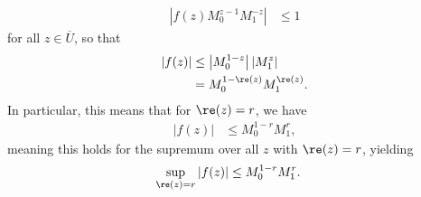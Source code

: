 \documentclass[10pt]{mypackage}
\begin{document}
\begin{solution}
\begin{align*}
    \left\vert f(z)M_0^{z-1}M_1^{-z} \right\vert &\leq 1
  \end{align*}
  for all $z\in \overline{U}$, so that
  \begin{align*}
    \left\vert f(z) \right\vert&\leq \left\vert M_0^{1-z} \right\vert \left\vert M_1^{z} \right\vert\\
                               &= M_0^{1-\re(z)} M_1^{\re(z)}.
  \end{align*}
  In particular, this means that for $\re(z) = r$, we have
  \begin{align*}
    \left\vert f(z) \right\vert &\leq M_0^{1-r}M_1^{r},
  \end{align*}
  meaning this holds for the supremum over all $z$ with $\re(z) = r$, yielding
  \begin{align*}
    \sup_{\re(z) = r} \left\vert f(z) \right\vert &\leq M_0^{1-r}M_1^{r}.
  \end{align*}
\end{solution}
\end{document}
